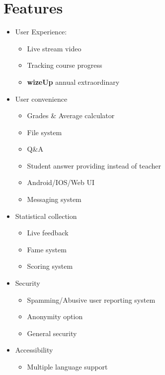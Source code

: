 \documentclass{article}
\begin{document}
\section{Features}

\begin{itemize}
\item User Experience: 
\begin{itemize}
\item Live stream video
\item Tracking course progress
\item \textbf{wizeUp} annual extraordinary
\end{itemize}
\item User convenience
\begin{itemize}
\item Grades & Average calculator
\item File system
\item Q&A
\item Student answer providing instead of teacher
\item Android/IOS/Web UI
\item Messaging system
\end{itemize}
\item Statistical collection
\begin{itemize}
\item Live feedback
\item Fame system
\item Scoring system
\end{itemize}
\item Security
\begin{itemize}
\item Spamming/Abusive user reporting system
\item Anonymity option 
\item General security
\end{itemize}
\item Accessibility 
\begin{itemize}
\item Multiple language support
\end{itemize}
\end{itemize}
\end{document}

